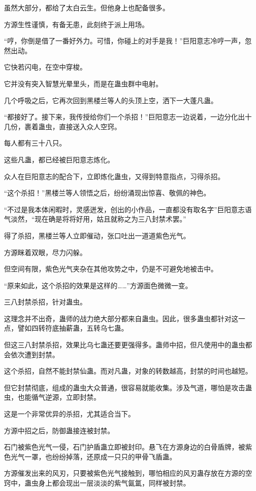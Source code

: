 \begin{this_body}
虽然大部分，都给了太白云生。但他身上也配备很多。

方源生性谨慎，有备无患，此刻终于派上用场。

“哼，你倒是借了一番好外力。可惜，你碰上的对手是我！”巨阳意志冷哼一声，忽然出动。

它快若闪电，在空中穿梭。

它并没有突入智慧光晕里头，而是在蛊虫群中电射。

几个呼吸之后，它再次回到黑楼兰等人的头顶上空，洒下一大蓬凡蛊。

“都接好了。接下来，我传授给你们一个杀招！”巨阳意志一边说着，一边分化出十几份，裹着蛊虫，直接送入众人空窍。

每人都有三十八只。

这些凡蛊，都已经被巨阳意志炼化。

众人在巨阳意志的配合下，立即炼化蛊虫，又得到特意指点，习得杀招。

“这个杀招！”黑楼兰等人领悟之后，纷纷涌现出惊喜、敬佩的神色。

“不过是我本体闲暇时，灵感迸发，创出的小作品，一直都没有取名字”巨阳意志语气淡然，“现在确是将将好用，姑且就称之为三八封禁术罢。”

得了杀招，黑楼兰等人立即催动，张口吐出一道道紫色光气。

方源眯着双眼，尽力闪躲。

但空间有限，紫色光气夹杂在其他攻势之中，仍是不可避免地被击中。

“原来如此，这个杀招的效果是这样的……”方源面色微微一变。

三八封禁杀招，针对蛊虫。

这理念并不出奇，蛊师的战力绝大部分都来自蛊虫。因此，很多蛊虫都针对这一点，譬如四转符底抽薪蛊，五转乌七蛊。

但这三八封禁杀招，效果比乌七蛊还要更强得多。蛊师中招，但凡使用中的蛊虫都会依次遭到封禁。

这个杀招，自然不能封禁仙蛊。而对凡蛊，对象的转数越高，封禁的时间也越短。

但它封禁彻底，组成的蛊虫大众普通，很容易就能收集。涉及气道，哪怕是攻击蛊虫，也能循气逆源，立即封禁。

这是一个非常优异的杀招，尤其适合当下。

方源中招之后，防御蛊接连被封禁。

石门被紫色光气一侵，石门护盾蛊立即被封印。悬飞在方源身边的白骨盾牌，被紫色光气一罩，也纷纷掉落，还原成一只只的甲骨飞盾蛊。

方源催发出来的风刃，只要被紫色光气接触到，哪怕相应的风刃蛊存放在方源的空窍中，蛊虫身上都会现出一层淡淡的紫气氤氲，同样被封禁。


\end{this_body}
